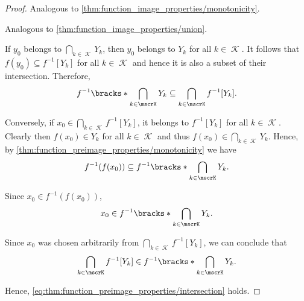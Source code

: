 \begin{proof}
   Analogous to \cref{thm:function_image_properties/monotonicity}.

   Analogous to \cref{thm:function_image_properties/union}.

   If \( y_0 \) belongs to \( \bigcap_{k \in \mscrK} Y_k \), then \( y_0 \) belongs to \( Y_k \) for all \( k \in \mscrK \). It follows that \( f(y_0) \subseteq f^{-1}[Y_k] \) for all \( k \in \mscrK \) and hence it is also a subset of their intersection. Therefore,
  \begin{equation*}
    f^{-1} \bracks*{ \bigcap_{k \in \mscrK} Y_k } \subseteq \bigcap_{k \in \mscrK} f^{-1}[Y_k].
  \end{equation*}

  Conversely, if \( x_0 \in \bigcap_{k \in \mscrK} f^{-1}[Y_k] \), it belongs to \( f^{-1}[Y_k] \) for all \( k \in \mscrK \). Clearly then \( f(x_0) \in Y_k \) for all \( k \in \mscrK \) and thus \( f(x_0) \in \bigcap_{k \in \mscrK} Y_k \). Hence, by \cref{thm:function_preimage_properties/monotonicity} we have
  \begin{equation*}
    f^{-1}(f(x_0))
    \subseteq
    f^{-1}\bracks*{ \bigcap_{k \in \mscrK} Y_k }.
  \end{equation*}

  Since \( x_0 \in f^{-1}(f(x_0)) \),
  \begin{equation*}
    x_0 \in f^{-1}\bracks*{ \bigcap_{k \in \mscrK} Y_k }.
  \end{equation*}

  Since \( x_0 \) was chosen arbitrarily from \( \bigcap_{k \in \mscrK} f^{-1}[Y_k] \), we can conclude that
  \begin{equation*}
    \bigcap_{k \in \mscrK} f^{-1}[Y_k] \in f^{-1}\bracks*{ \bigcap_{k \in \mscrK} Y_k }.
  \end{equation*}

  Hence, \eqref{eq:thm:function_preimage_properties/intersection} holds.


\end{proof}
